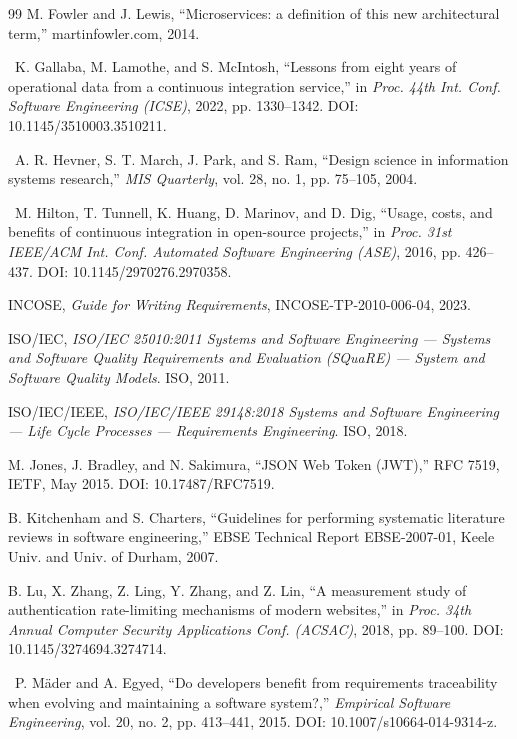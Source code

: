 \begin{thebibliography}{99}
 M. Fowler and J. Lewis, ``Microservices: a definition of this new architectural term,'' martinfowler.com, 2014.

\dag\ K. Gallaba, M. Lamothe, and S. McIntosh, ``Lessons from eight years of operational data from a continuous integration service,'' in \textit{Proc. 44th Int. Conf. Software Engineering (ICSE)}, 2022, pp. 1330--1342. DOI: 10.1145/3510003.3510211.

\dag\ A. R. Hevner, S. T. March, J. Park, and S. Ram, ``Design science in information systems research,'' \textit{MIS Quarterly}, vol. 28, no. 1, pp. 75--105, 2004.

\dag\ M. Hilton, T. Tunnell, K. Huang, D. Marinov, and D. Dig, ``Usage, costs, and benefits of continuous integration in open-source projects,'' in \textit{Proc. 31st IEEE/ACM Int. Conf. Automated Software Engineering (ASE)}, 2016, pp. 426--437. DOI: 10.1145/2970276.2970358.

 INCOSE, \textit{Guide for Writing Requirements}, INCOSE-TP-2010-006-04, 2023.

 ISO/IEC, \textit{ISO/IEC 25010:2011 Systems and Software Engineering --- Systems and Software Quality Requirements and Evaluation (SQuaRE) --- System and Software Quality Models}. ISO, 2011.

 ISO/IEC/IEEE, \textit{ISO/IEC/IEEE 29148:2018 Systems and Software Engineering --- Life Cycle Processes --- Requirements Engineering}. ISO, 2018.

 M. Jones, J. Bradley, and N. Sakimura, ``JSON Web Token (JWT),'' RFC 7519, IETF, May 2015. DOI: 10.17487/RFC7519.

 B. Kitchenham and S. Charters, ``Guidelines for performing systematic literature reviews in software engineering,'' EBSE Technical Report EBSE-2007-01, Keele Univ. and Univ. of Durham, 2007.

 B. Lu, X. Zhang, Z. Ling, Y. Zhang, and Z. Lin, ``A measurement study of authentication rate-limiting mechanisms of modern websites,'' in \textit{Proc. 34th Annual Computer Security Applications Conf. (ACSAC)}, 2018, pp. 89--100. DOI: 10.1145/3274694.3274714.

\dag\ P. Mäder and A. Egyed, ``Do developers benefit from requirements traceability when evolving and maintaining a software system?,'' \textit{Empirical Software Engineering}, vol. 20, no. 2, pp. 413--441, 2015. DOI: 10.1007/s10664-014-9314-z.


\end{thebibliography}
